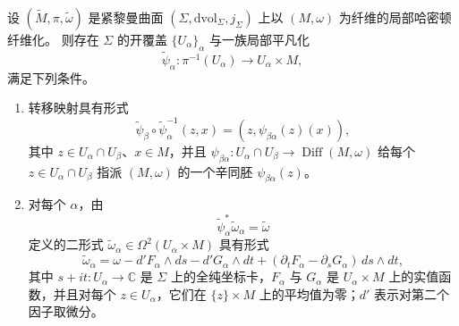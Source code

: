 \begin{proposition}\label{prop:8-2-2}
设 $(\widetilde M,\pi,\widetilde\omega)$ 是紧黎曼曲面
$(\Sigma,\mathrm{dvol}_\Sigma,j_\Sigma)$ 上以 $(M,\omega)$ 为纤维的局部哈密顿纤维化。
则存在 $\Sigma$ 的开覆盖 $\{U_\alpha\}_\alpha$ 与一族局部平凡化
\[
  \widetilde\psi_\alpha:\pi^{-1}(U_\alpha)\longrightarrow U_\alpha\times M,
\]
满足下列条件。
\begin{enumerate}[label=\textup{(\roman*)},leftmargin=3em]
\item 转移映射具有形式
\[
  \widetilde\psi_\beta\circ\widetilde\psi_\alpha^{-1}(z,x)
  =(z,\psi_{\beta\alpha}(z)(x)),
\]
其中 $z\in U_\alpha\cap U_\beta$、$x\in M$，并且
$\psi_{\beta\alpha}:U_\alpha\cap U_\beta\to\operatorname{Diff}(M,\omega)$ 给每个
$z\in U_\alpha\cap U_\beta$ 指派 $(M,\omega)$ 的一个辛同胚
$\psi_{\beta\alpha}(z)$。
\item 对每个 $\alpha$，由
\[
  \widetilde\psi_\alpha^*\widetilde\omega_\alpha=\widetilde\omega
\]
定义的二形式 $\widetilde\omega_\alpha\in\Omega^2(U_\alpha\times M)$ 具有形式
\begin{equation}\label{eq:8-2-2}
  \widetilde\omega_\alpha
  =\omega-d'F_\alpha\wedge ds-d'G_\alpha\wedge dt
   +(\partial_tF_\alpha-\partial_sG_\alpha)\,ds\wedge dt,
\end{equation}
其中 $s+it:U_\alpha\to\mathbb C$ 是 $\Sigma$ 上的全纯坐标卡，$F_\alpha$ 与
$G_\alpha$ 是 $U_\alpha\times M$ 上的实值函数，并且对每个 $z\in U_\alpha$，它们在
$\{z\}\times M$ 上的平均值为零；$d'$ 表示对第二个因子取微分。
\end{enumerate}
\end{proposition}

